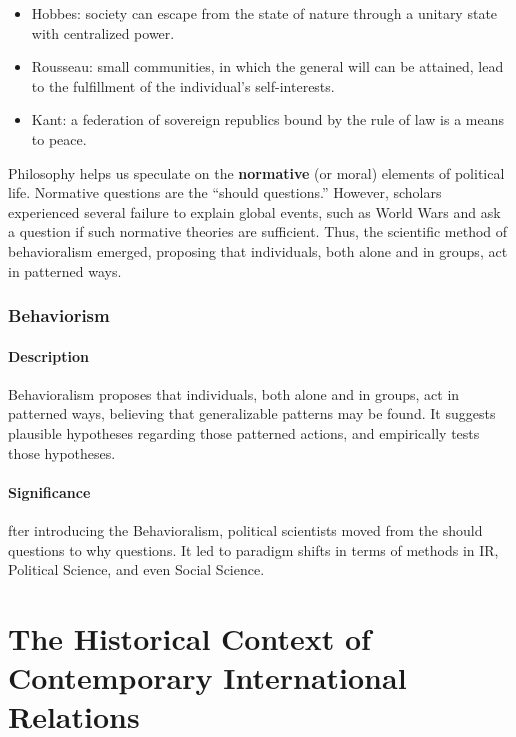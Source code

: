 \documentclass[
]{book}
\begin{document}
\begin{itemize}
\item
  Hobbes: society can escape from the state of nature through a unitary state with centralized power.
\item
  Rousseau: small communities, in which the general will can be attained, lead to the fulfillment of the individual's self-interests.
\item
  Kant: a federation of sovereign republics bound by the rule of law is a means to peace.
\end{itemize}

Philosophy helps us speculate on the \textbf{normative} (or moral) elements of political life. Normative questions are the ``should questions.'' However, scholars experienced several failure to explain global events, such as World Wars and ask a question if such normative theories are sufficient. Thus, the scientific method of behavioralism emerged, proposing that individuals, both alone and in groups, act in patterned ways.

\hypertarget{behaviorism}{%
\subsection{Behaviorism}\label{behaviorism}}

\hypertarget{description}{%
\subsubsection{Description}\label{description}}

Behavioralism proposes that individuals, both alone and in groups, act in patterned ways, believing that generalizable patterns may be found. It suggests plausible hypotheses regarding those patterned actions, and empirically tests those hypotheses.

\hypertarget{significance}{%
\subsubsection{Significance}\label{significance}}

fter introducing the Behavioralism, political scientists moved from the should questions to why questions. It led to paradigm shifts in terms of methods in IR, Political Science, and even Social Science.

\hypertarget{the-historical-context-of-contemporary-international-relations}{%
\chapter{The Historical Context of Contemporary International Relations}\label{the-historical-context-of-contemporary-international-relations}}
\end{document}
